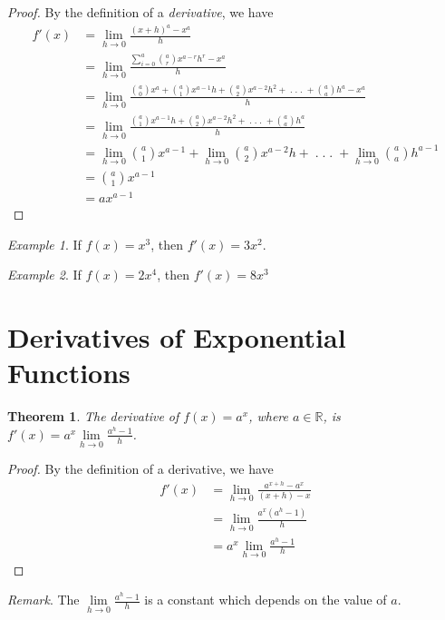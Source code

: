 \documentclass{article}
\theoremstyle{plain}
\newtheorem{theorem}{Theorem}
\theoremstyle{definition}
\theoremstyle{remark}
\newtheorem{example}{Example}
\newcommand{\R}{\mathbb{R}}
\begin{document}
  \begin{proof}
	By the definition of a \textit{derivative}, we have
	\begin{align*}
		f'(x)
			&=	\lim\limits_{h\to0} \frac{(x+h)^a-x^a}{h}\\
			&=	\lim\limits_{h\to0} \frac{\sum^{a}_{i=0}{a\choose r}x^{a-r}h^r-x^a}{h}\\
			&=	\lim\limits_{h\to0} \frac{{a\choose 0} x^a+{a\choose 1}x^{a-1}h+{a\choose 2}x^{a-2}h^2+\;.\;.\;.\;+{a\choose a}h^a-x^a}{h}\\
			&=	\lim\limits_{h\to0} \frac{{a\choose 1}x^{a-1}h+{a\choose 2}x^{a-2}h^2+\;.\;.\;.\;+{a\choose a}h^a}{h}\\
			&=	\lim\limits_{h\to0} {a\choose 1}x^{a-1}+\lim\limits_{h\to0}{a\choose 2}x^{a-2}h +\;.\;.\;.\;+\lim\limits_{h\to0}{a\choose a}h^{a-1}\\
			&=	{a\choose 1}x^{a-1}\\
            &=ax^{a-1}
	\end{align*}
\end{proof}

\begin{example}
    If $f(x)=x^3$, then $f'(x)=3x^2$.
\end{example}

\begin{example}
    If $f(x)=2x^4$, then $f'(x)=8x^3$
\end{example}
    
\section{Derivatives of Exponential Functions}

\begin{theorem}
    The derivative of $f(x)=a^x$, where $a\in\R$, is $f'(x)=a^x\lim\limits_{h\to0} \frac{a^h-1}{h}$.
\end{theorem}
   
    \begin{proof}
	By the definition of a derivative, we have
	\begin{align*}
		f'(x)
			&=	\lim\limits_{h\to0} \frac{a^{x+h}-a^x}{(x+h)-x}\\
			&=	\lim\limits_{h\to0} \frac{a^x(a^h-1)}{h}\\
			&=	a^x\lim\limits_{h\to0} \frac{a^h-1}{h}
	\end{align*}
    \end{proof}

\textit{Remark}.
The $\lim\limits_{h\to0} \frac{a^h-1}{h}$ is a constant which depends on the value of $a$.
\end{document}
